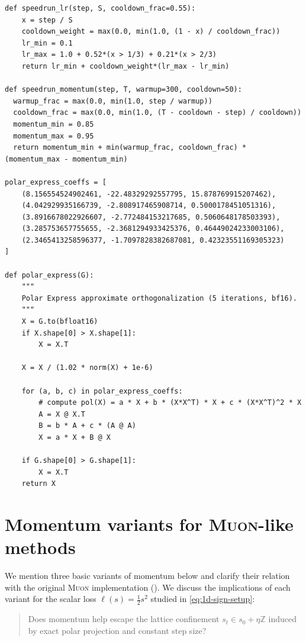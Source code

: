 \documentclass{article}
\theoremstyle{plain}
\theoremstyle{definition}
\theoremstyle{remark}
\newcommand{\Z}{\mathbb{Z}}
\newcommand{\sv}{{s}} %
\newcommand{\Muon}{\textsc{Muon}}
\begin{document}
\begin{lstlisting}[style=pyalgo, caption={Speedrun schedules and Polar Express orthogonalization}, label={alg:muon-aux}]
def speedrun_lr(step, S, cooldown_frac=0.55):
    x = step / S
    cooldown_weight = max(0.0, min(1.0, (1 - x) / cooldown_frac))
    lr_min = 0.1
    lr_max = 1.0 + 0.52*(x > 1/3) + 0.21*(x > 2/3)
    return lr_min + cooldown_weight*(lr_max - lr_min)

def speedrun_momentum(step, T, warmup=300, cooldown=50):
  warmup_frac = max(0.0, min(1.0, step / warmup))
  cooldown_frac = max(0.0, min(1.0, (T - cooldown - step) / cooldown))
  momentum_min = 0.85
  momentum_max = 0.95
  return momentum_min + min(warmup_frac, cooldown_frac) * (momentum_max - momentum_min)

polar_express_coeffs = [
    (8.156554524902461, -22.48329292557795, 15.878769915207462),
    (4.042929935166739, -2.808917465908714, 0.5000178451051316),
    (3.8916678022926607, -2.772484153217685, 0.5060648178503393),
    (3.285753657755655, -2.3681294933425376, 0.46449024233003106),
    (2.3465413258596377, -1.7097828382687081, 0.42323551169305323)
]

def polar_express(G):
    """
    Polar Express approximate orthogonalization (5 iterations, bf16).
    """
    X = G.to(bfloat16)
    if X.shape[0] > X.shape[1]:
        X = X.T

    X = X / (1.02 * norm(X) + 1e-6)

    for (a, b, c) in polar_express_coeffs:
        # compute pol(X) = a * X + b * (X*X^T) * X + c * (X*X^T)^2 * X
        A = X @ X.T
        B = b * A + c * (A @ A)
        X = a * X + B @ X

    if G.shape[0] > G.shape[1]:
        X = X.T
    return X
\end{lstlisting}

\section{Momentum variants for \Muon{}-like methods}
\label{app:momentum}


We mention three basic variants of momentum below and clarify their relation with the original \Muon{} implementation ().  
We discuss the implications of each variant for the scalar loss 
$\ell(\sv)=\tfrac12\sv^2$ studied in \eqref{eq:1d-sign-setup}: 
\begin{quote}
  Does momentum help escape the lattice confinement
  $\sv_t\in \sv_0+\eta\Z$ induced by exact polar projection and constant step size?
\end{quote}
\end{document}
